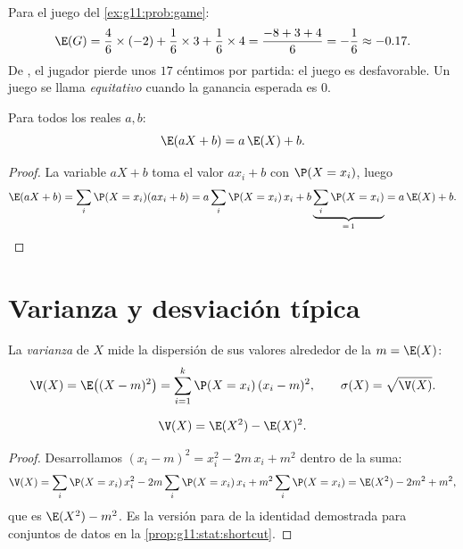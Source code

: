 \begin{example}\label{ex:g11:prob:gameexp}
Para el juego del \cref{ex:g11:prob:game}:
\[
\E(G) = \frac46 \times (-2) + \frac16 \times 3 + \frac16 \times 4
= \frac{-8 + 3 + 4}{6} = -\frac16 \approx -0.17 .
\]
De , el jugador pierde unos $17$ céntimos por partida: el juego es
desfavorable. Un juego se llama \emph{equitativo} cuando la ganancia
esperada es $0$.
\end{example}

\begin{proposition}[Linealidad]\label{prop:g11:prob:linearity}
Para todos los reales $a, b$:
\[
\E(aX + b) = a\,\E(X) + b .
\]
\end{proposition}

\begin{proof}
La variable $aX + b$ toma el valor $a x_i + b$ con 
$\P(X = x_i)$, luego
\[
\E(aX + b) = \sum_i \P(X = x_i)(a x_i + b)
= a \sum_i \P(X = x_i)\,x_i + b \underbrace{\sum_i \P(X =
x_i)}_{=\,1} = a\,\E(X) + b .
\]
\end{proof}

\section{Varianza y desviación típica}

\begin{definition}[Varianza]\label{def:g11:prob:variance}
La \emph{varianza} de $X$ mide la dispersión de sus
valores alrededor de la  $m = \E(X)$:
\[
\V(X) = \E\bigl((X - m)^2\bigr)
= \sum_{i=1}^{k} \P(X = x_i)\,(x_i - m)^2,
\qquad
\sigma(X) = \sqrt{\V(X)} .
\]
\end{definition}

\begin{proposition}\label{prop:g11:prob:konig}
\[
\V(X) = \E(X^2) - \E(X)^2 .
\]
\end{proposition}

\begin{proof}
Desarrollamos $(x_i - m)^2 = x_i^2 - 2m\,x_i + m^2$ dentro de la suma:
\[
\V(X) = \sum_i \P(X = x_i)\,x_i^2
- 2m \sum_i \P(X = x_i)\,x_i + m^2\sum_i \P(X = x_i)
= \E(X^2) - 2m^2 + m^2 ,
\]
que es $\E(X^2) - m^2$. Es la versión para  de la
identidad demostrada para conjuntos de datos en la
\cref{prop:g11:stat:shortcut}.
\end{proof}

